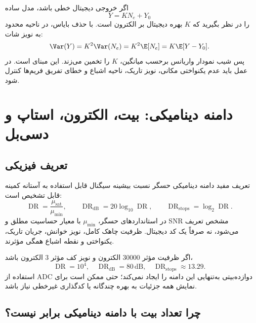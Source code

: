 اگر خروجی دیجیتال خطی باشد، مدل ساده
\begin{equation}
Y=K N_e+Y_0
\end{equation}
را در نظر بگیرید که \(K\) بهره دیجیتال بر الکترون است. با حذف بایاس، در ناحیه محدود به نویز شات:
\begin{equation}
\Var(Y)=K^2\Var(N_e)=K^2\E[N_e]=K\E[Y-Y_0].
\end{equation}
پس شیب نمودار واریانس برحسب میانگین، \(K\) را تخمین می‌زند. این مبنای 
است. در عمل باید عدم یکنواختی مکانی، نویز تاریک، ناحیه اشباع و خطای تفریق فریم‌ها کنترل شود.

\section{دامنه دینامیکی: بیت، الکترون، استاپ و دسی‌بل}

\subsection{تعریف فیزیکی}

تعریف مفید دامنه دینامیکی حسگر نسبت بیشینه سیگنال قابل استفاده به آستانه کمینه قابل تشخیص است:
\begin{equation}
\operatorname{DR}=\frac{\mu_{\mathrm{sat}}}{\mu_{\min}},
\qquad
\operatorname{DR}_{\mathrm{dB}}=20\log_{10}\operatorname{DR},
\qquad
\operatorname{DR}_{\mathrm{stops}}=\log_2\operatorname{DR}.
\label{eq:dynamic-range}
\end{equation}
در استانداردهای حسگر، \(\mu_{\min}\) با معیار حساسیت مطلق و SNR مشخص تعریف می‌شود، نه صرفاً
یک کد دیجیتال. ظرفیت چاهک کامل، نویز خوانش، جریان تاریک، یکنواختی و نقطه اشباع همگی مؤثرند.

\begin{example}
اگر ظرفیت مؤثر \(30000\) الکترون و نویز کف مؤثر \(3\) الکترون باشد،
\begin{equation}
\operatorname{DR}=10^4,
\quad \operatorname{DR}_{\mathrm{dB}}=80\,\mathrm{dB},
\quad \operatorname{DR}_{\mathrm{stops}}\approx13.29.
\end{equation}
استفاده از ADC دوازده‌بیتی به‌تنهایی این دامنه را ایجاد نمی‌کند؛ حتی ممکن است برای نمایش همه
جزئیات به بهره چندگانه یا کدگذاری غیرخطی نیاز باشد.
\end{example}

\subsection{چرا تعداد بیت با دامنه دینامیکی برابر نیست؟}

